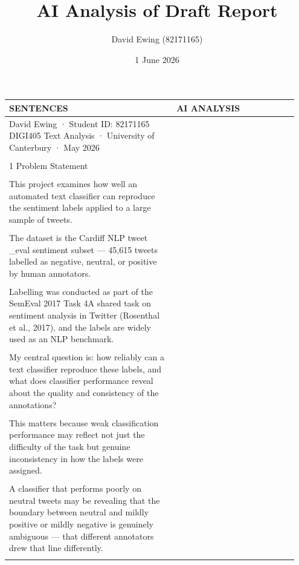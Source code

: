 \documentclass[11pt]{article}
\title{AI Analysis of Draft Report}
\author{David Ewing (82171165)}
\date{1 June 2026}
\begin{document}
\maketitle
\thispagestyle{empty}
\newpage

\setlength{\LTleft}{0pt}
\setlength{\LTright}{0pt}
\begin{longtable}{|p{0.55\linewidth}|p{0.40\linewidth}|}
\hline
\centering\textbf{SENTENCES} & \centering\textbf{AI ANALYSIS} \tabularnewline[2pt]
\hline
\endhead
David Ewing · Student ID: 82171165 DIGI405 Text Analysis · University of Canterbury · May 2026 & \\[2pt]
\hline
\rule{0pt}{3.5cm} & \\
\hline
1 Problem Statement & \\[2pt]
\hline
\rule{0pt}{3.5cm} & \\
\hline
This project examines how well an automated text classifier can reproduce the sentiment labels applied to a large sample of tweets. & \\[2pt]
\hline
\rule{0pt}{3.5cm} & \\
\hline
The dataset is the Cardiff NLP tweet \_eval sentiment subset --- 45,615 tweets labelled as negative, neutral, or positive by human annotators. & \\[2pt]
\hline
\rule{0pt}{3.5cm} & \\
\hline
Labelling was conducted as part of the SemEval 2017 Task 4A shared task on sentiment analysis in Twitter (Rosenthal et al., 2017), and the labels are widely used as an NLP benchmark. & \\[2pt]
\hline
\rule{0pt}{3.5cm} & \\
\hline
My central question is: how reliably can a text classifier reproduce these labels, and what does classifier performance reveal about the quality and consistency of the annotations? & \\[2pt]
\hline
\rule{0pt}{3.5cm} & \\
\hline
This matters because weak classification performance may reflect not just the difficulty of the task but genuine inconsistency in how the labels were assigned. & \\[2pt]
\hline
\rule{0pt}{3.5cm} & \\
\hline
A classifier that performs poorly on neutral tweets may be revealing that the boundary between neutral and mildly positive or mildly negative is genuinely ambiguous --- that different annotators drew that line differently. & \\[2pt]
\hline
\rule{0pt}{3.5cm} & \\

\end{longtable}
\end{document}
